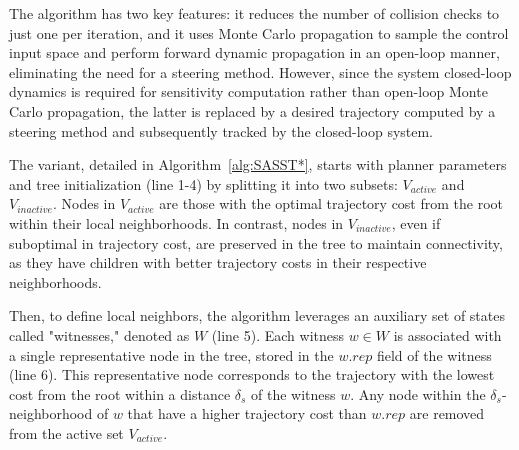 The  algorithm has two key features: it reduces the number of collision checks to just one per iteration, and it uses Monte Carlo propagation to sample the control input space and perform forward dynamic propagation in an open-loop manner, eliminating the need for a steering method.
However, since the system closed-loop dynamics is required for sensitivity computation rather than open-loop Monte Carlo propagation, the latter is replaced by a desired trajectory computed by a steering method and subsequently tracked by the closed-loop system.

The  variant, detailed in Algorithm~\ref{alg:SASST*}, starts with planner parameters and tree initialization (line 1-4) by splitting it into two subsets: $V_{active}$ and $V_{inactive}.$
Nodes in $V_{active}$ are those with the optimal trajectory cost from the root within their local neighborhoods. 
In contrast, nodes in $V_{inactive}$, even if suboptimal in trajectory cost, are preserved in the tree to maintain connectivity, as they have children with better trajectory costs in their respective neighborhoods. 

Then, to define local neighbors, the algorithm leverages an auxiliary set of states called "witnesses," denoted as $W$ (line 5). 
Each witness $w \in W$ is associated with a single representative node in the tree, stored in the $w.rep$ field of the witness (line 6).
This representative node corresponds to the trajectory with the lowest cost from the root within a distance $\delta_s$ of the witness $w$.
Any node within the $\delta_s$-neighborhood of $w$ that have a higher trajectory cost than $w.rep$ are removed from the active set $V_{active}$.

